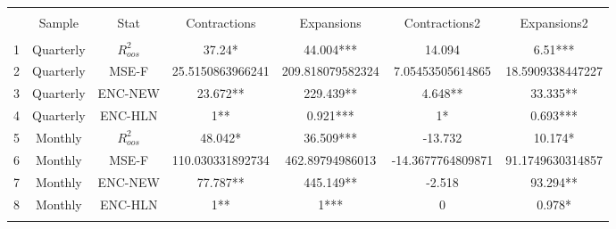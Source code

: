 \begin{table}[!htbp] \centering 
  \caption{} 
  \label{} 
\begin{tabular}{@{\extracolsep{5pt}} ccccccc} 
\\[-1.8ex]\hline 
\hline \\[-1.8ex] 
 & Sample & Stat & Contractions & Expansions & Contractions2 & Expansions2 \\ 
\hline \\[-1.8ex] 
1 & Quarterly & $R^{2}_{oos}$ & 37.24* & 44.004*** & 14.094 & 6.51*** \\ 
2 & Quarterly & MSE-F & 25.5150863966241 & 209.818079582324 & 7.05453505614865 & 18.5909338447227 \\ 
3 & Quarterly & ENC-NEW & 23.672** & 229.439** & 4.648** & 33.335** \\ 
4 & Quarterly & ENC-HLN & 1** & 0.921*** & 1* & 0.693*** \\ 
5 & Monthly & $R^{2}_{oos}$ & 48.042* & 36.509*** & -13.732 & 10.174* \\ 
6 & Monthly & MSE-F & 110.030331892734 & 462.89794986013 & -14.3677764809871 & 91.1749630314857 \\ 
7 & Monthly & ENC-NEW & 77.787** & 445.149** & -2.518 & 93.294** \\ 
8 & Monthly & ENC-HLN & 1** & 1*** & 0 & 0.978* \\ 
\hline \\[-1.8ex] 
\end{tabular} 
\end{table} 